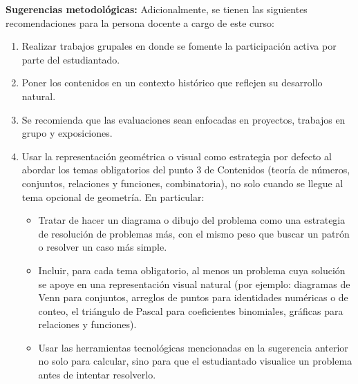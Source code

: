 \begin{refsection}
\textbf{Sugerencias metodológicas:} Adicionalmente, se tienen las siguientes recomendaciones para la persona docente a cargo de este curso:
\begin{enumerate}
    \item Realizar trabajos grupales en donde se fomente la participación activa por parte del estudiantado.
    \item Poner los contenidos en un contexto hist\'orico que reflejen su desarrollo natural. 
    \item Se recomienda que las evaluaciones sean enfocadas en proyectos, trabajos en grupo y exposiciones. 
    \item Usar la representación geométrica o visual como estrategia por
  defecto al abordar los temas obligatorios del punto 3 de Contenidos
  (teoría de números, conjuntos, relaciones y funciones,
  combinatoria), no solo cuando se llegue al tema opcional de
  geometría. En particular:
  \begin{itemize}
    \item Tratar de hacer un diagrama o dibujo del problema como una estrategia de resolución de problemas más, con el mismo peso que buscar un patrón o resolver un caso más simple.
    \item Incluir, para cada tema obligatorio, al menos un problema cuya solución se apoye en una representación visual natural (por ejemplo: diagramas de Venn para conjuntos, arreglos de
      puntos para identidades numéricas o de conteo, el triángulo de Pascal para coeficientes binomiales, gráficas para relaciones y
      funciones).
    \item Usar las herramientas tecnológicas mencionadas en la sugerencia anterior no solo para calcular, sino para que el estudiantado visualice un problema antes de intentar    resolverlo.
  \end{itemize}
    

\end{enumerate}
\end{refsection}
